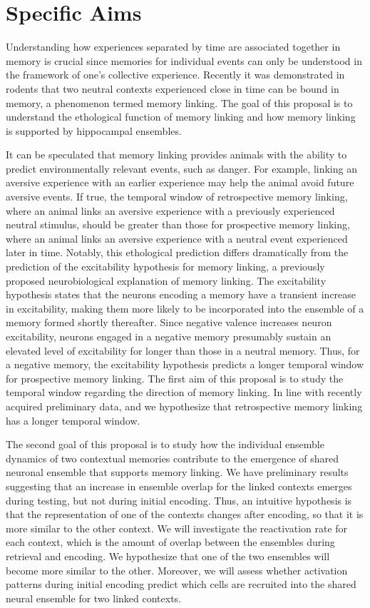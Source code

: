 \documentclass[master.tex]{subfiles}
\begin{document}
\section*{Specific Aims}

Understanding how experiences separated by time are associated together in
memory is crucial since memories for individual events can only be understood in
the framework of one's collective experience. Recently it was demonstrated in
rodents that two neutral contexts experienced close in time can be bound in
memory, a phenomenon termed memory linking. The goal of this proposal is to
understand the ethological function of memory linking and how memory linking is
supported by hippocampal ensembles.

It can be speculated that memory linking provides animals with the ability to
predict environmentally relevant events, such as danger. For example, linking an
aversive experience with an earlier experience may help the animal avoid future
aversive events. If true, the temporal window of retrospective memory linking,
where an animal links an aversive experience with a previously experienced
neutral stimulus, should be greater than those for prospective memory linking,
where an animal links an aversive experience with a neutral event experienced
later in time. Notably, this ethological prediction differs dramatically from
the prediction of the excitability hypothesis for memory linking, a previously
proposed neurobiological explanation of memory linking. The excitability
hypothesis states that the neurons encoding a memory have a transient increase
in excitability, making them more likely to be incorporated into the ensemble of
a memory formed shortly thereafter. Since negative valence increases neuron
excitability, neurons engaged in a negative memory presumably sustain an
elevated level of excitability for longer than those in a neutral memory. Thus,
for a negative memory, the excitability hypothesis predicts a longer temporal
window for prospective memory linking. The first aim of this proposal is to
study the temporal window regarding the direction of memory linking. In line
with recently acquired preliminary data, and we hypothesize that retrospective
memory linking has a longer temporal window.

The second goal of this proposal is to study how the individual ensemble
dynamics of two contextual memories contribute to the emergence of shared
neuronal ensemble that supports memory linking. We have preliminary results
suggesting that an increase in ensemble overlap for the linked contexts emerges
during testing, but not during initial encoding. Thus, an intuitive hypothesis
is that the representation of one of the contexts changes after encoding, so
that it is more similar to the other context. We will investigate the
reactivation rate for each context, which is the amount of overlap between the
ensembles during retrieval and encoding. We hypothesize that one of the two
ensembles will become more similar to the other. Moreover, we will assess
whether activation patterns during initial encoding predict which cells are
recruited into the shared neural ensemble for two linked contexts.
\end{document}
